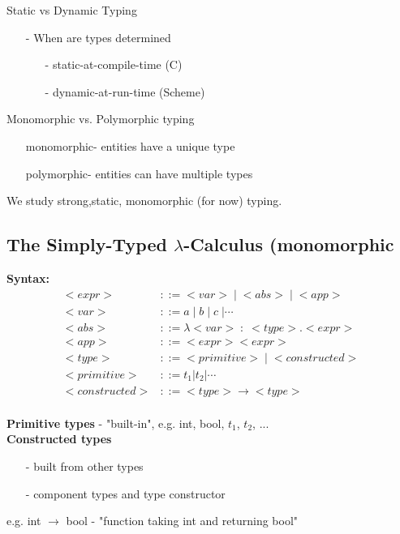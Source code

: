 \documentclass[11pt]{article}
\begin{document}
Static vs Dynamic Typing
\begin{itemize}
	\item[-] When are types determined
		\begin{itemize}
			\item[-] static-at-compile-time (C)
			\item[-] dynamic-at-run-time (Scheme)
		\end{itemize}
\end{itemize}

Monomorphic vs. Polymorphic typing
\begin{itemize}
	\item[monomorphic-] entities have a unique type
	\item[polymorphic-] entities can have multiple types
\end{itemize}

We study strong,static, monomorphic (for now) typing. \\

\subsection{The Simply-Typed $\lambda$-Calculus (monomorphic}

{\bf Syntax:}
\begin{align*}
<expr> &::= <var>\;|\;<abs>\;|\;<app> \\
<var> &::= a\;|\;b\;|\;c\;|\cdots \\
<abs> &::= \lambda <var>\;:\;<type>.<expr> \\
<app> &::= <expr><expr> \\
<type> &::= <primitive>\;|\;<constructed> \\
<primitive> &::= t_1|t_2|\cdots \\
<constructed> &::= <type> \rightarrow <type> \\
\end{align*}

{\bf Primitive types} - "built-in", e.g. int, bool, $t_1$, $t_2$, ... \\

{\bf Constructed types} 
\begin{itemize}
	\item[-] built from other types
	\item[-] component types and type constructor
\end{itemize}

e.g. int $\rightarrow$ bool - "function taking int and returning bool" \\
\end{document}
